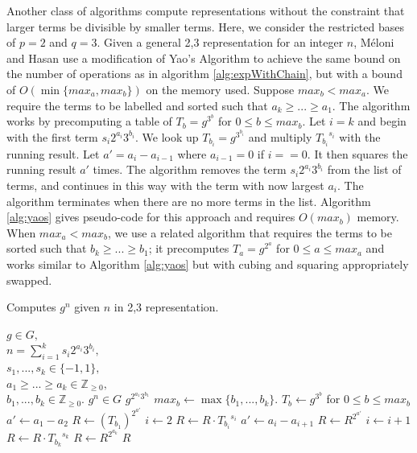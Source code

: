 \documentclass{ucalgthes1}
\theoremstyle{plain}
\theoremstyle{definition}
\newcommand{\ZZgez}{\mathbb{Z}_{\ge 0}}
\begin{document}
Another class of algorithms compute representations without the constraint that larger terms be divisible by smaller terms.  Here, we consider the restricted bases of $p=2$ and $q=3$.  Given a general 2,3 representation for an integer $n$, M\'{e}loni and Hasan use a modification of Yao's Algorithm \cite[Section 3.2]{Meloni2009} to achieve the same bound on the number of operations as in algorithm \ref{alg:expWithChain}, but with a bound of $O(\min \{max_a, max_b\})$ on the memory used.  Suppose $max_b < max_a$.  We require the terms to be labelled and sorted such that $a_k \ge ... \ge a_1$.  The algorithm works by precomputing a table of $T_b = g^{3^b}$ for $0 \le b \le max_b$.  Let $i=k$ and begin with the first term $s_i2^{a_i}3^{b_i}$.  We look up $T_{b_i} = g^{3^{b_i}}$ and multiply ${T_{b_i}}^{s_i}$ with the running result.  Let $a' = a_i - a_{i-1}$ where $a_{i-1} = 0$ if $i == 0$.  It then squares the running result $a'$ times.  The algorithm removes the term $s_i2^{a_i}3^{b_i}$ from the list of terms, and continues in this way with the term with now largest $a_i$.  The algorithm terminates when there are no more terms in the list.  Algorithm  \ref{alg:yaos} gives pseudo-code for this approach and requires $O(max_b)$ memory.  When $max_a < max_b$, we use a related algorithm that requires the terms to be sorted such that $b_k \ge ... \ge b_1$; it precomputes $T_a = g^{2^a}$ for $0 \le a \le max_a$ and works similar to Algorithm \ref{alg:yaos} but with cubing and squaring appropriately swapped.

\begin{algorithm}[htb!]
\caption{Computes $g^n$ given $n$ in 2,3 representation.}\label{alg:yaos}
\begin{algorithmic}[1]
\REQUIRE $g \in G,$ \\
$n = \sum_{i=1}^k s_i2^{a_i}3^{b_i},$ \\
$s_1,...,s_k \in \{-1, 1\},$ \\
$a_1 \ge ... \ge a_k \in \ZZgez,$ \\
$b_1,...,b_k \in \ZZgez.$
\ENSURE $g^n \in G$
	\RETURN $g^{2^{a_1} 3^{b_1}}$
\ENDIF
\STATE $max_b \gets \max \{ b_1, ..., b_k \}$.
\STATE $T_b \gets g^{3^b}$ for $0 \le b \le max_b$ 
\STATE $a' \gets a_1-a_2$
\STATE $R \gets \left( T_{b_1} \right)^{2^{a'}}$ 
\STATE $i \gets 2$
	\STATE $R \gets R \cdot {T_{b_i}}^{s_i}$
	\STATE $a' \gets a_i - a_{i+1}$
	\STATE $R \gets R ^ {2^{a'}}$ 
	\STATE $i \gets i + 1$
\ENDWHILE
\STATE $R \gets R \cdot {T_{b_k}}^{s_k}$
\STATE $R \gets R ^ {2^{a_k}}$ 
\RETURN $R$
\end{algorithmic}
\end{algorithm}
\end{document}
